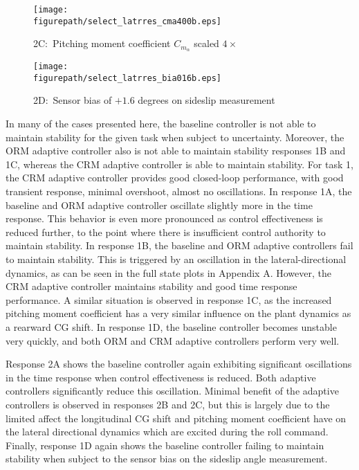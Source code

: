 \begin{figure}[H]
  \begin{center}
    \texttt{[image: \\figurepath/select\_latrres\_cma400b.eps]}
    \caption{2C:\ Pitching moment coefficient $C_{m_{\alpha}}$ scaled $4\times$}
  \end{center}
\end{figure}

\begin{figure}[H]
  \begin{center}
    \texttt{[image: \\figurepath/select\_latrres\_bia016b.eps]}
    \caption{2D:\ Sensor bias of $+1.6$ degrees on sideslip measurement}
  \end{center}
\end{figure}

In many of the cases presented here, the baseline controller is not able to maintain stability for the given task when subject to uncertainty.
Moreover, the ORM adaptive controller also is not able to maintain stability responses 1B and 1C, whereas the CRM adaptive controller is able to maintain stability.
For task 1, the CRM adaptive controller provides good closed-loop performance, with good transient response, minimal overshoot, almost no oscillations.
In response 1A, the baseline and ORM adaptive controller oscillate slightly more in the time response.
This behavior is even more pronounced as control effectiveness is reduced further, to the point where there is insufficient control authority to maintain stability.
In response 1B, the baseline and ORM adaptive controllers fail to maintain stability.
This is triggered by an oscillation in the lateral-directional dynamics, as can be seen in the full state plots in Appendix A.
However, the CRM adaptive controller maintains stability and good time response performance.
A similar situation is observed in response 1C, as the increased pitching moment coefficient has a very similar influence on the plant dynamics as a rearward CG shift.
In response 1D, the baseline controller becomes unstable very quickly, and both ORM and CRM adaptive controllers perform very well.

Response 2A shows the baseline controller again exhibiting significant oscillations in the time response when control effectiveness is reduced.
Both adaptive controllers significantly reduce this oscillation.
Minimal benefit of the adaptive controllers is observed in responses 2B and 2C, but this is largely due to the limited affect the longitudinal CG shift and pitching moment coefficient have on the lateral directional dynamics which are excited during the roll command.
Finally, response 1D again shows the baseline controller failing to maintain stability when subject to the sensor bias on the sideslip angle measurement.


